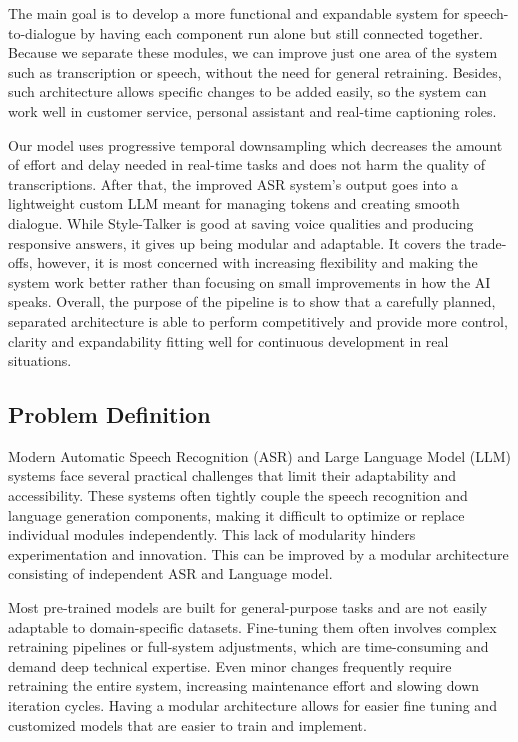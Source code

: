 The main goal is to develop a more functional and expandable system for speech-to-dialogue by having each component run alone but still connected together. Because we separate these modules, we can improve just one area of the system such as transcription or speech, without the need for general retraining. Besides, such architecture allows specific changes to be added easily, so the system can work well in customer service, personal assistant and real-time captioning roles.

Our model uses progressive temporal downsampling which decreases the amount of effort and delay needed in real-time tasks and does not harm the quality of transcriptions. After that, the improved ASR system’s output goes into a lightweight custom LLM meant for managing tokens and creating smooth dialogue. While Style-Talker is good at saving voice qualities and producing responsive answers, it gives up being modular and adaptable. It covers the trade-offs, however, it is most concerned with increasing flexibility and making the system work better rather than focusing on small improvements in how the AI speaks. Overall, the purpose of the pipeline is to show that a carefully planned, separated architecture is able to perform competitively and provide more control, clarity and expandability fitting well for continuous development in real situations.

\subsection{Problem Definition}
Modern Automatic Speech Recognition (ASR) and Large Language Model (LLM) systems face several practical challenges that limit their adaptability and accessibility. These systems often tightly couple the speech recognition and language generation components, making it difficult to optimize or replace individual modules independently. This lack of modularity hinders experimentation and innovation. This can be improved by a modular architecture consisting of independent ASR and Language model.

Most pre-trained models are built for general-purpose tasks and are not easily adaptable to domain-specific datasets. Fine-tuning them often involves complex retraining pipelines or full-system adjustments, which are time-consuming and demand deep technical expertise.
Even minor changes frequently require retraining the entire system, increasing maintenance effort and slowing down iteration cycles. Having a modular architecture allows for easier fine tuning and customized models that are easier to train and implement.

